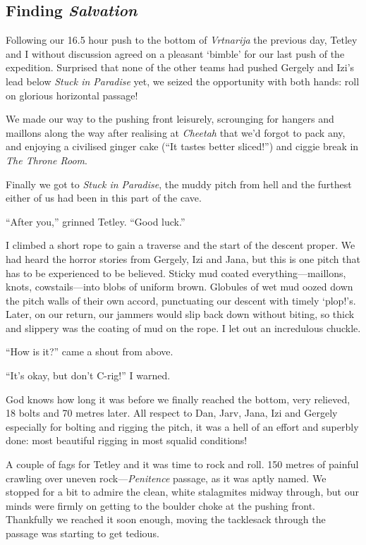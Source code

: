 
\hypertarget{finding-salvation}{%
\subsection{\texorpdfstring{Finding
\emph{Salvation}}{Finding Salvation}}\label{finding-salvation}}

Following our 16.5 hour push to the bottom of \emph{Vrtnarija} the
previous day, Tetley and I without discussion agreed on a pleasant
`bimble' for our last push of the expedition. Surprised that none of the
other teams had pushed Gergely and Izi's lead below \emph{Stuck in
Paradise} yet, we seized the opportunity with both hands: roll on
glorious horizontal passage!

We made our way to the pushing front leisurely, scrounging for hangers
and maillons along the way after realising at \emph{Cheetah} that we'd
forgot to pack any, and enjoying a civilised ginger cake (``It tastes
better sliced!'') and ciggie break in \emph{The Throne Room}.

Finally we got to \emph{Stuck in Paradise}, the muddy pitch from hell
and the furthest either of us had been in this part of the cave.

``After you,'' grinned Tetley. ``Good luck.''

I climbed a short rope to gain a traverse and the start of the descent
proper. We had heard the horror stories from Gergely, Izi and Jana, but
this is one pitch that has to be experienced to be believed. Sticky mud
coated everything---maillons, knots, cowstails---into blobs of uniform
brown. Globules of wet mud oozed down the pitch walls of their own
accord, punctuating our descent with timely `plop!'s. Later, on our
return, our jammers would slip back down without biting, so thick and
slippery was the coating of mud on the rope. I let out an incredulous
chuckle.

``How is it?'' came a shout from above.

``It's okay, but don't C-rig!'' I warned.

God knows how long it was before we finally reached the bottom, very
relieved, 18 bolts and 70 metres later. All respect to Dan, Jarv, Jana,
Izi and Gergely especially for bolting and rigging the pitch, it was a
hell of an effort and superbly done: most beautiful rigging in most
squalid conditions!

A couple of fags for Tetley and it was time to rock and roll. 150 metres
of painful crawling over uneven rock---\emph{Penitence} passage, as it
was aptly named. We stopped for a bit to admire the clean, white
stalagmites midway through, but our minds were firmly on getting to the
boulder choke at the pushing front. Thankfully we reached it soon
enough, moving the tacklesack through the passage was starting to get
tedious.

